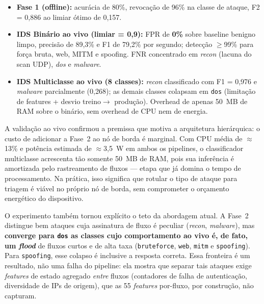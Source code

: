 \documentclass[12pt]{article}
\begin{document}
\begin{itemize}
  \item \textbf{Fase 1 (offline):} acurácia de 80\%, revocação de 96\% na
    classe de ataque, F2 = 0,886 ao limiar ótimo de 0,157.
  \item \textbf{IDS Binário ao vivo (limiar = 0,9):} FPR de \textbf{0\%} sobre
    baseline benigno limpo, precisão de 89,3\% e F1 de 79,2\% por segundo;
    detecção $\geq$99\% para força bruta, web, MITM e spoofing. FNR concentrado
    em \textit{recon} (lacuna do scan UDP), \textit{dos} e \textit{malware}.
  \item \textbf{IDS Multiclasse ao vivo (8 classes):} \textit{recon} classificado
    com F1 = 0,976 e \textit{malware} parcialmente (0,268); as demais classes
    colapsam em \texttt{dos} (limitação de features + desvio treino$\rightarrow$
    produção). Overhead de apenas 50~MB de RAM sobre o binário, sem overhead de
    CPU nem de energia.
\end{itemize}

A validação ao vivo confirmou a premissa que motiva a arquitetura hierárquica:
o custo de adicionar a Fase~2 ao nó de borda é marginal. Com CPU média de
$\approx$13\% e potência estimada de $\approx$3,5~W em ambos os pipelines, o
classificador multiclasse acrescenta tão somente 50~MB de RAM, pois sua
inferência é amortizada pelo rastreamento de fluxos — etapa que já domina o
tempo de processamento. Na prática, isso significa que rotular o tipo de ataque
para triagem é viável no próprio nó de borda, sem comprometer o orçamento
energético do dispositivo.

O experimento também tornou explícito o teto da abordagem atual. A Fase~2
distingue bem ataques cuja assinatura de fluxo é peculiar (\textit{recon},
\textit{malware}), mas \textbf{converge para \texttt{dos} as classes cujo
comportamento ao vivo é, de fato, um \textit{flood}} de fluxos curtos e de alta
taxa (\texttt{bruteforce}, \texttt{web}, \texttt{mitm} e \texttt{spoofing}). Para
\texttt{spoofing}, esse colapso é inclusive a resposta correta. Essa fronteira é
um resultado, não uma falha do pipeline: ela mostra que separar tais ataques
exige \textit{features} de estado agregado \textit{entre} fluxos (contadores de
falha de autenticação, diversidade de IPs de origem), que as 55 \textit{features}
por-fluxo, por construção, não capturam.
\end{document}
